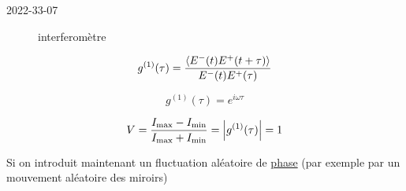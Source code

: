 


2022-33-07

\begin{figure}[ht]
    \centering
    \caption{interferomètre}
    \label{fig:interferomètre}
\end{figure}


$$g^{(1)}(\tau ) = \frac{\expval{E^{-}(t) E^{+}(t+ \tau)}}{E^{-}(t)E^{+}(\tau)} $$ 

$$g^{(1)}(\tau)  =e^{i\omega \tau}$$ 

$$V = \frac{I_{\text{max}} - I_{\text{min}}  }{I_{\text{max}} + I_{\text{min}} } = \abs{g^{(1)}(\tau)}  =1 $$ 

Si on introduit maintenant un fluctuation aléatoire de \underline{phase} (par exemple par un mouvement aléatoire des miroirs)







